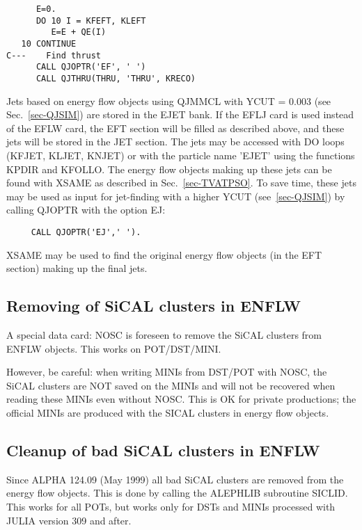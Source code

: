 \begin{verbatim}
      E=0.
      DO 10 I = KFEFT, KLEFT
         E=E + QE(I)
   10 CONTINUE
C---    Find thrust
      CALL QJOPTR('EF', ' ')
      CALL QJTHRU(THRU, 'THRU', KRECO)
\end{verbatim}
\par
Jets based on energy flow objects using QJMMCL with YCUT = 0.003
(see Sec.~\ref{sec-QJSIM})
are
stored in the EJET bank.
If the EFLJ card is used instead of the EFLW card, the EFT section will
be filled as described above, and these jets will be stored in the JET
section.
The jets may be accessed with DO loops (KFJET, KLJET, KNJET)
or with the particle name 'EJET' using the functions KPDIR and KFOLLO.
The energy flow objects making up these jets can be found with XSAME
as described in Sec.~\ref{sec-TVATPSO}.
To save time, these jets may be used as input for jet-finding with a
higher YCUT (see~\ref{sec-QJSIM})
by calling QJOPTR with the option EJ:
\begin{verbatim}
     CALL QJOPTR('EJ',' ').
\end{verbatim}
XSAME may be used to find the original energy flow objects
(in the EFT section) making up the final jets.
 

\subsection{\label{sec-EFLWR}Removing of SiCAL clusters in ENFLW}
 
 A special data card:  NOSC  is foreseen to remove  the SiCAL clusters from ENFLW  objects.
    This works on POT/DST/MINI.
\par
      However, be careful:
   when writing  MINIs from DST/POT with NOSC,
      the SiCAL clusters are NOT   saved on the MINIs and will not be recovered when reading these MINIs
                                    even without NOSC. This is OK
      for private productions; the official MINIs are
         produced with the SICAL clusters in energy flow objects.

\subsection{\label{sec-EFLSICL}Cleanup of bad SiCAL clusters in ENFLW}

Since ALPHA 124.09 (May 1999) all bad SiCAL clusters are removed from the energy flow objects. This is done
by calling the ALEPHLIB subroutine SICLID. This works for all POTs, but works only  for DSTs and MINIs processed with
 JULIA version 309 and after.

